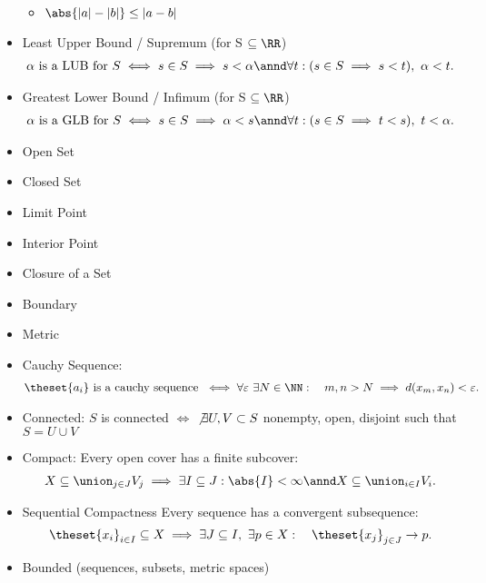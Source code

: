 \begin{itemize}
  \begin{itemize}
  \tightlist
  \item
    \({\abs{| a | - | b |} \leq | a - b | }\)
  \end{itemize}
\item
  Least Upper Bound / Supremum (for S \(\subseteq \RR\))
  \begin{align*}  
  \alpha\text{ is a LUB for } S \iff s \in S \implies s < \alpha \annd \forall t : (s \in S \implies s < t),~ \alpha < t
  .\end{align*}
\item
  Greatest Lower Bound / Infimum (for S \(\subseteq \RR\))
  \begin{align*}  
  \alpha\text{ is a GLB for } S \iff s \in S \implies \alpha < s \annd \forall t : (s \in S \implies t < s),~ t < \alpha
  .\end{align*}
\item
  Open Set
\item
  Closed Set
\item
  Limit Point
\item
  Interior Point
\item
  Closure of a Set
\item
  Boundary
\item
  Metric
\item
  Cauchy Sequence:
  \begin{align*}  
  \theset{a_i} \text{ is a cauchy sequence } \iff \forall \varepsilon~\exists N\in\NN: \quad m,n > N \implies d(x_m, x_n) < \varepsilon
  .\end{align*}
\item
  Connected: \(S\) is connected \(\iff\) \(\not\exists U,V\subset S\)
  nonempty, open, disjoint such that \(S = U \cup V\)
\item
  Compact: Every open cover has a finite subcover:
  \begin{align*}  
  X \subseteq \union_{j\in J} V_j \implies \exists I \subseteq J: \abs{I} < \infty \annd X\subseteq \union_{i\in I} V_i
  .\end{align*}
\item
  Sequential Compactness Every sequence has a convergent subsequence:
  \begin{align*}  
  \theset{x_i}_{i\in I}\subseteq X \implies \exists J\subseteq I,~ \exists p\in X: \quad \theset{x_j}_{j\in J} \to p
  .\end{align*}
\item
  Bounded (sequences, subsets, metric spaces)
  \begin{align*}  

\end{align*}
\end{itemize}
